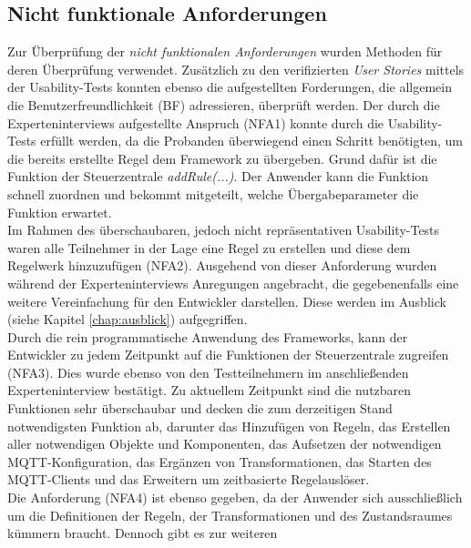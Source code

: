     \subsection*{Nicht funktionale Anforderungen}
        Zur Überprüfung der \textit{nicht funktionalen Anforderungen} wurden Methoden für deren Überprüfung verwendet. Zusätzlich zu den 
        verifizierten \textit{User Stories} mittels der Usability-Tests konnten ebenso die aufgestellten Forderungen, die allgemein 
        die Benutzerfreundlichkeit (BF) adressieren, überprüft werden. Der durch die Experteninterviews aufgestellte Anspruch (NFA1) konnte 
        durch die Usability-Tests erfüllt werden, da die Probanden überwiegend einen Schritt benötigten, um die bereits erstellte Regel 
        dem Framework zu übergeben. Grund dafür ist die Funktion der Steuerzentrale \textit{addRule(...)}. Der Anwender kann die Funktion 
        schnell zuordnen und bekommt mitgeteilt, welche Übergabeparameter die Funktion erwartet.
        \\
        \linebreak 
        Im Rahmen des überschaubaren, jedoch nicht repräsentativen Usability-Tests waren alle Teilnehmer in der Lage eine Regel zu erstellen 
        und diese dem Regelwerk hinzuzufügen (NFA2). Ausgehend von dieser Anforderung wurden 
        während der Experteninterviews Anregungen angebracht, die gegebenenfalls eine weitere Vereinfachung für den Entwickler darstellen. 
        Diese werden im Ausblick (siehe Kapitel \ref{chap:ausblick}) aufgegriffen. 
        \\
        Durch die rein programmatische Anwendung des Frameworks, kann der Entwickler zu jedem Zeitpunkt auf die Funktionen der Steuerzentrale zugreifen (NFA3). 
        Dies wurde ebenso von den Testteilnehmern im anschließenden Experteninterview bestätigt. Zu aktuellem Zeitpunkt sind die nutzbaren Funktionen sehr 
        überschaubar und decken die zum derzeitigen Stand notwendigsten Funktion ab, darunter das Hinzufügen von Regeln, 
        das Erstellen aller notwendigen Objekte und Komponenten, das Aufsetzen der notwendigen \acs{MQTT}-Konfiguration, das Ergänzen von Transformationen, das Starten 
        des \acs{MQTT}-Clients und das Erweitern um zeitbasierte Regelauslöser. 
        \\
        \linebreak 
        Die Anforderung (NFA4) ist ebenso gegeben, da der Anwender sich 
        ausschließlich um die Definitionen der Regeln, der Transformationen und des Zustandsraumes kümmern braucht. Dennoch gibt es zur weiteren 
